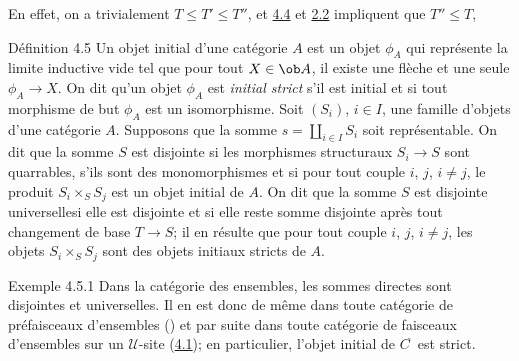 En effet, on a trivialement $T\leq T'\leq T''$, et \hyperref[II.theo4.4]{4.4}
et \hyperref[II.prop2.2]{2.2} impliquent que $T''\leq T$, \cqfd

\begin{enonce*}{Définition 4.5}
Un objet initial d'une catégorie $A$ est un objet $\phi_A$ qui
représente la limite inductive vide \ie tel que pour tout $X\in
\ob A$, il existe une flèche et une seule $\phi_A\rightarrow X$. On
dit qu'un objet $\phi_A$ est \emph{initial strict} s'il est initial
et si tout morphisme de but $\phi_{A}$ est un isomorphisme. Soit
$(S_i)$, $i\in I$, une famille d'objets d'une catégorie $A$.
Supposons que la somme $s=\amalg_{i\in I} S_i$ soit représentable.
On dit que la somme $S$ est disjointe si les morphismes structuraux
$S_i\rightarrow S$ sont quarrables, s'ils sont des monomorphismes et
si pour tout couple $i$, $j$, $i\neq j$, le produit $S_i\times_S
S_j$ est un objet initial de $A$. On dit que la somme $S$ est
disjointe universelle\pageoriginale si elle est disjointe et si elle
reste somme disjointe après tout changement de base $T\rightarrow
S$; il en résulte que pour tout couple $i$, $j$, $i\neq j$, les
objets $S_i\times_S S_j$ sont des objets initiaux stricts de $A$.
\end{enonce*}

\begin{enonce*}[remark]{Exemple 4.5.1}
Dans la catégorie des ensembles, les sommes directes sont
disjointes et universelles. Il en est donc de même dans toute
catégorie de préfaisceaux d'ensembles () et par
suite dans toute catégorie de faisceaux d'ensembles sur un
$𝒰$-site (\hyperref[II.theo4.1]{4.1}); en particulier, l'objet initial
de $C^{\widetilde{\phantom{,}}}$ est strict.
\end{enonce*}

